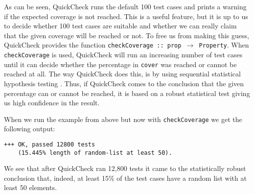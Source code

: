 As can be seen, QuickCheck runs the default 100 test cases and prints a warning if the expected coverage is not reached. This is a useful feature, but it is up to us to decide whether 100 test cases are suitable and whether we can really claim that the given coverage will be reached or not. To free us from making this guess, QuickCheck provides the function \texttt{checkCoverage :: prop $\rightarrow$ Property}. When \texttt{checkCoverage} is used, QuickCheck will run an increasing number of test cases until it can decide whether the percentage in \texttt{cover} was reached or cannot be reached at all. The way QuickCheck does this, is by using sequential statistical hypothesis testing \cite{wald_sequential_1992}. Thus, if QuickCheck comes to the conclusion that the given percentage can or cannot be reached, it is based on a robust statistical test giving us high confidence in the result.

When we run the example from above but now with \texttt{checkCoverage} we get the following output:

\begin{footnotesize}
\begin{verbatim}
+++ OK, passed 12800 tests 
    (15.445% length of random-list at least 50).
\end{verbatim}
\end{footnotesize}

We see that after QuickCheck ran 12,800 tests it came to the statistically robust conclusion that, indeed, at least 15\% of the test cases have a random list with at least 50 elements. 